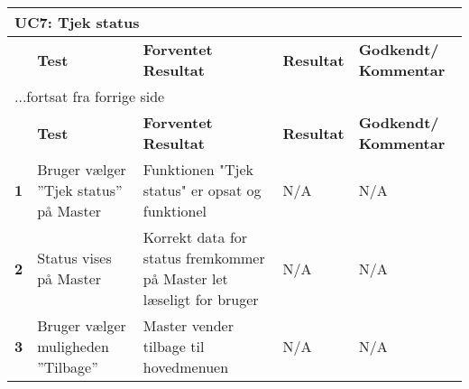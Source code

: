 \begin{center}
\begin{longtable}{|p{}|p{}|p{}|p{}|p{}|} %
\hline
\multicolumn{5}{|l|}{\textbf{UC7: Tjek status}} \\ \hline
\multicolumn{1}{|c|}{} &
\textbf{Test} &
\textbf{Forventet \newline Resultat} &
\textbf{Resultat} &
\textbf{Godkendt/ \newline Kommentar} \\ \hline 
\endfirsthead

\multicolumn{5}{l}{...fortsat fra forrige side} \\ \hline 
\multicolumn{1}{|c|}{} &
\textbf{Test} &
\textbf{Forventet \newline Resultat} &
\textbf{Resultat} &
\textbf{Godkendt/ \newline Kommentar} \\ \hline 
\endhead

\textbf{1}	&Bruger vælger ''Tjek status'' på Master
			&Funktionen "Tjek status" er opsat og funktionel
			&N/A
			&N/A \\ \hline 
			
\textbf{2}	&Status vises på Master
			&Korrekt data for status fremkommer på Master let læseligt for bruger
			&N/A
			&N/A \\ \hline 
			
\textbf{3}	&Bruger vælger muligheden ''Tilbage''
			&Master vender tilbage til hovedmenuen
			&N/A
			&N/A \\ \hline 
			
\end{longtable}
	\label{ATUC7} 
\end{center}
